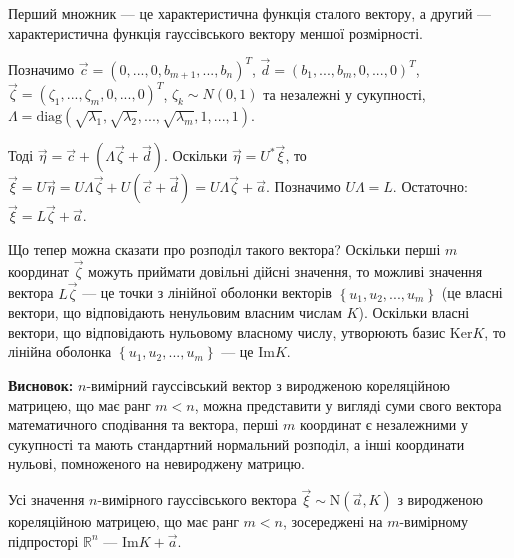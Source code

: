 Перший множник --- це характеристична функція сталого вектору, а другий --- характеристична функція гауссівського вектору меншої розмірності.

Позначимо $\vec{c} = (0, ..., 0, b_{m+1}, ..., b_{n})^T$,
$\vec{d} = (b_1, ..., b_m, 0, ..., 0)^T$,
$\vec{\zeta} = (\zeta_1, ..., \zeta_m, 0, ..., 0)^T$, $\zeta_k \sim {N}(0, 1)$ та незалежні у сукупності,
$\Lambda = \mathrm{diag}(\sqrt{\lambda_1}, \sqrt{\lambda_2}, ..., \sqrt{\lambda_m}, 1, ..., 1)$.

Тоді $\vec{\eta} = \vec{c} + \left(\Lambda \vec{\zeta} + \vec{d} \right)$. 
Оскільки $\vec{\eta} = U^{*}\vec{\xi}$, то $\vec{\xi} = U\vec{\eta} = U\Lambda \vec{\zeta} + U(\vec{c} + \vec{d}) = U\Lambda \vec{\zeta} + \vec{a}$.
Позначимо $U\Lambda = L$. Остаточно: $\vec{\xi} = L\vec{\zeta} + \vec{a}$.

Що тепер можна сказати про розподіл такого вектора? Оскільки перші $m$ координат $\vec{\zeta}$ можуть приймати довільні дійсні значення, то
можливі значення вектора $L\vec{\zeta}$ --- це точки з лінійної оболонки векторів $\left\{u_1, u_2, ..., u_m\right\}$ (це власні вектори, що відповідають ненульовим власним числам $K$).
Оскільки власні вектори, що відповідають нульовому власному числу, утворюють базис $\mathrm{Ker}K$, то лінійна оболонка $\left\{u_1, u_2, ..., u_m\right\}$ --- це $\mathrm{Im}K$.


\textbf{Висновок:} $n$-вимірний гауссівський вектор з виродженою кореляційною матрицею, що має ранг $m<n$, можна представити
у вигляді суми свого вектора математичного сподівання та вектора, перші $m$ координат є незалежними у сукупності та мають стандартний нормальний розподіл, 
а інші координати нульові, помноженого на невироджену матрицю. 

Усі значення $n$-вимірного гауссівського вектора $\vec{\xi} \sim \mathrm{N}(\vec{a}, K)$ з виродженою кореляційною матрицею, що має ранг $m<n$,
зосереджені на $m$-вимірному підпросторі $\mathbb{R}^n$ --- $\mathrm{Im}K + \vec{a}$.

